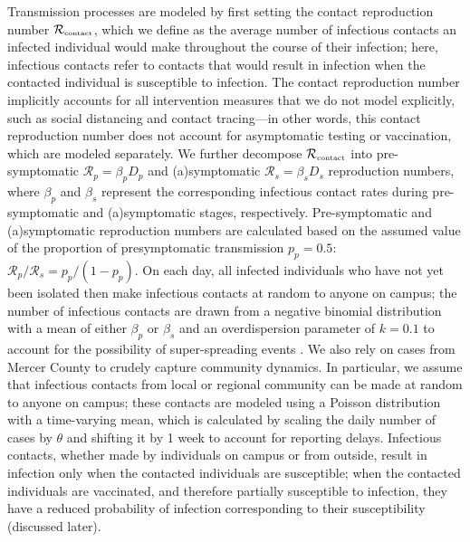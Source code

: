 \documentclass[12pt]{article}
\newcommand{\Rx}[1]{\ensuremath{{\mathcal R}_{#1}}}
\newcommand{\Rc}{\Rx{\textrm{\tiny{contact}}}}
\begin{document}
Transmission processes are modeled by first setting the contact reproduction number $\Rc$, which we define as the average number of infectious contacts an infected individual would make throughout the course of their infection;
here, infectious contacts refer to contacts that would result in infection when the contacted individual is susceptible to infection.
The contact reproduction number implicitly accounts for all intervention measures that we do not model explicitly, such as social distancing and contact tracing---in other words, this contact reproduction number does not account for asymptomatic testing or vaccination, which are modeled separately.
We further decompose $\Rc$ into pre-symptomatic $\mathcal R_p = \beta_p D_p$ and (a)symptomatic $\mathcal R_s = \beta_s D_s$ reproduction numbers, where $\beta_p$ and $\beta_s$ represent the corresponding infectious contact rates during pre-symptomatic and (a)symptomatic stages, respectively. Pre-symptomatic and (a)symptomatic reproduction numbers are calculated based on the assumed value of the proportion of presymptomatic transmission $p_p = 0.5$: $\mathcal R_p/\mathcal R_s = p_p/(1 - p_p)$.
On each day, all infected individuals who have not yet been isolated then make infectious contacts at random to anyone on campus; the number of infectious contacts are drawn from a negative binomial distribution with a mean of either $\beta_p$ or $\beta_s$ and an overdispersion parameter of $k=0.1$ to account for the possibility of super-spreading events \citep{10.12688/wellcomeopenres.15842.3}.
We also rely on cases from Mercer County to crudely capture community dynamics.
In particular, we assume that infectious contacts from local or regional community can be made at random to anyone on campus; these contacts are modeled using a Poisson distribution with a time-varying mean, which is calculated by scaling the daily number of cases by $\theta$ and shifting it by 1 week to account for reporting delays.
Infectious contacts, whether made by individuals on campus or from outside, result in infection only when the contacted individuals are susceptible; when the contacted individuals are vaccinated, and therefore partially susceptible to infection, they have a reduced probability of infection corresponding to their susceptibility (discussed later).
\end{document}
